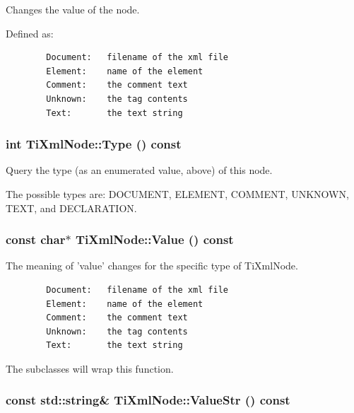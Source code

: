 Changes the value of the node. 

Defined as: 

\footnotesize\begin{verbatim}
		Document:	filename of the xml file
		Element:	name of the element
		Comment:	the comment text
		Unknown:	the tag contents
		Text:		the text string
		\end{verbatim}
\normalsize
{}
\subsubsection{\setlength{\rightskip}{0pt plus 5cm}int Ti\-Xml\-Node::Type () const\hspace{0.3cm}{\tt  [inline, inherited]}}\label{classTiXmlNode_TiXmlUnknowna62}


Query the type (as an enumerated value, above) of this node. 

The possible types are: DOCUMENT, ELEMENT, COMMENT, UNKNOWN, TEXT, and DECLARATION.
\subsubsection{\setlength{\rightskip}{0pt plus 5cm}const char$\ast$ Ti\-Xml\-Node::Value () const\hspace{0.3cm}{\tt  [inline, inherited]}}\label{classTiXmlNode_TiXmlUnknowna7}


The meaning of 'value' changes for the specific type of Ti\-Xml\-Node. 



\footnotesize\begin{verbatim}
		Document:	filename of the xml file
		Element:	name of the element
		Comment:	the comment text
		Unknown:	the tag contents
		Text:		the text string
		\end{verbatim}
\normalsize


The subclasses will wrap this function.
\subsubsection{\setlength{\rightskip}{0pt plus 5cm}const std::string\& Ti\-Xml\-Node::Value\-Str () const\hspace{0.3cm}{\tt  [inline, inherited]}}\label{classTiXmlNode_TiXmlUnknowna8}


